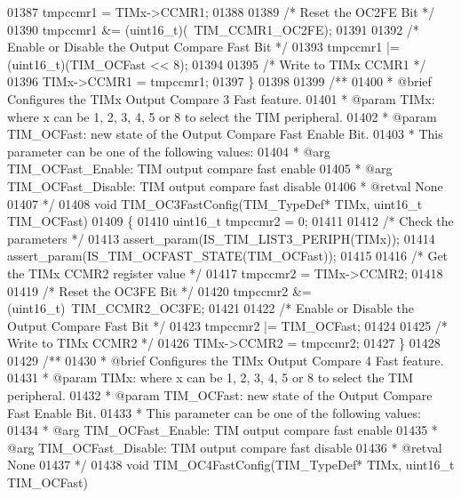 \begin{DoxyCode}
01387   tmpccmr1 = TIMx->CCMR1;
01388 
01389   \textcolor{comment}{/* Reset the OC2FE Bit */}
01390   tmpccmr1 &= (uint16\_t)(~TIM_CCMR1_OC2FE);
01391 
01392   \textcolor{comment}{/* Enable or Disable the Output Compare Fast Bit */}
01393   tmpccmr1 |= (uint16\_t)(TIM\_OCFast << 8);
01394 
01395   \textcolor{comment}{/* Write to TIMx CCMR1 */}
01396   TIMx->CCMR1 = tmpccmr1;
01397 \}
01398 
01399 \textcolor{comment}{/**}
01400 \textcolor{comment}{  * @brief  Configures the TIMx Output Compare 3 Fast feature.}
01401 \textcolor{comment}{  * @param  TIMx: where x can be  1, 2, 3, 4, 5 or 8 to select the TIM peripheral.}
01402 \textcolor{comment}{  * @param  TIM\_OCFast: new state of the Output Compare Fast Enable Bit.}
01403 \textcolor{comment}{  *          This parameter can be one of the following values:}
01404 \textcolor{comment}{  *            @arg TIM\_OCFast\_Enable: TIM output compare fast enable}
01405 \textcolor{comment}{  *            @arg TIM\_OCFast\_Disable: TIM output compare fast disable}
01406 \textcolor{comment}{  * @retval None}
01407 \textcolor{comment}{  */}
01408 \textcolor{keywordtype}{void} TIM_OC3FastConfig(TIM\_TypeDef* TIMx, uint16\_t TIM\_OCFast)
01409 \{
01410   uint16\_t tmpccmr2 = 0;
01411 
01412   \textcolor{comment}{/* Check the parameters */}
01413   assert_param(IS\_TIM\_LIST3\_PERIPH(TIMx));
01414   assert_param(IS\_TIM\_OCFAST\_STATE(TIM\_OCFast));
01415 
01416   \textcolor{comment}{/* Get the TIMx CCMR2 register value */}
01417   tmpccmr2 = TIMx->CCMR2;
01418 
01419   \textcolor{comment}{/* Reset the OC3FE Bit */}
01420   tmpccmr2 &= (uint16\_t)~TIM_CCMR2_OC3FE;
01421 
01422   \textcolor{comment}{/* Enable or Disable the Output Compare Fast Bit */}
01423   tmpccmr2 |= TIM\_OCFast;
01424 
01425   \textcolor{comment}{/* Write to TIMx CCMR2 */}
01426   TIMx->CCMR2 = tmpccmr2;
01427 \}
01428 
01429 \textcolor{comment}{/**}
01430 \textcolor{comment}{  * @brief  Configures the TIMx Output Compare 4 Fast feature.}
01431 \textcolor{comment}{  * @param  TIMx: where x can be  1, 2, 3, 4, 5 or 8 to select the TIM peripheral.}
01432 \textcolor{comment}{  * @param  TIM\_OCFast: new state of the Output Compare Fast Enable Bit.}
01433 \textcolor{comment}{  *          This parameter can be one of the following values:}
01434 \textcolor{comment}{  *            @arg TIM\_OCFast\_Enable: TIM output compare fast enable}
01435 \textcolor{comment}{  *            @arg TIM\_OCFast\_Disable: TIM output compare fast disable}
01436 \textcolor{comment}{  * @retval None}
01437 \textcolor{comment}{  */}
01438 \textcolor{keywordtype}{void} TIM_OC4FastConfig(TIM\_TypeDef* TIMx, uint16\_t TIM\_OCFast)

\end{DoxyCode}
